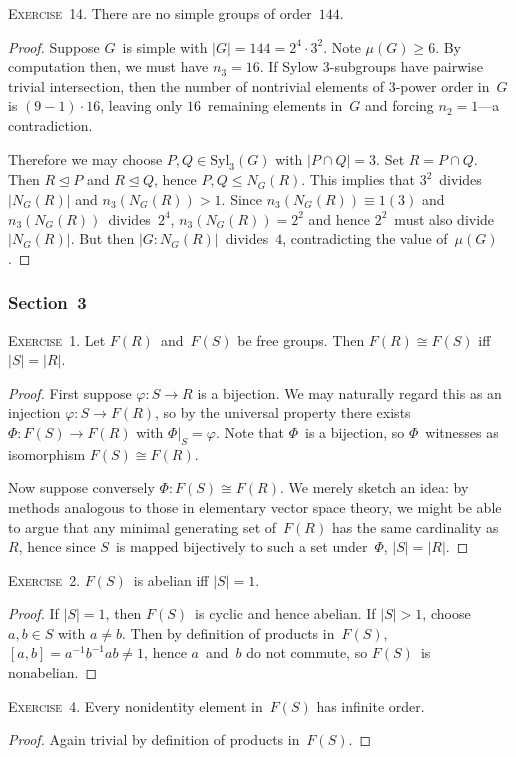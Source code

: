 \documentclass[letterpaper]{article}
\newcommand{\exercise}[1]{\goodbreak\noindent\textsc{Exercise~{#1}.}}
\newcommand{\iso}{\cong}
\newcommand{\sect}{\cap}
\newcommand{\subgroup}{\le}
\newcommand{\normal}{\trianglelefteq}
\newcommand{\syl}{\mathrm{Syl}}
\newcommand{\ord}[1]{|{#1}|}
\newcommand{\gindex}[2]{|{#1}:{#2}|}
\newcommand{\mpsi}[1]{\mu({#1})}
\begin{document}
\exercise{14}
There are no simple groups of order~$144$.
\begin{proof}
Suppose $G$~is simple with $\ord{G}=144=2^4\cdot 3^2$. Note $\mpsi{G}\ge 6$. By computation then, we must have $n_3=16$. If Sylow $3$-subgroups have pairwise trivial intersection, then the number of nontrivial elements of $3$-power order in~$G$ is $(9-1)\cdot 16$, leaving only $16$~remaining elements in~$G$ and forcing $n_2=1$---a contradiction.

Therefore we may choose $P,Q\in\syl_3(G)$ with $\ord{P\sect Q}=3$. Set $R=P\sect Q$. Then $R\normal P$ and $R\normal Q$, hence $P,Q\subgroup N_G(R)$. This implies that $3^2$~divides~$\ord{N_G(R)}$ and $n_3(N_G(R))>1$. Since $n_3(N_G(R))\equiv 1(3)$ and $n_3(N_G(R))$~divides~$2^4$, $n_3(N_G(R))=2^2$ and hence $2^2$~must also divide~$\ord{N_G(R)}$. But then $\gindex{G}{N_G(R)}$~divides~$4$, contradicting the value of~$\mpsi{G}$.
\end{proof}

\subsubsection*{Section~3}
\exercise{1}
Let $F(R)$~and~$F(S)$ be free groups. Then $F(R)\iso F(S)$ iff $\ord{S}=\ord{R}$.
\begin{proof}
First suppose $\varphi:S\to R$ is a bijection. We may naturally regard this as an injection $\varphi:S\to F(R)$, so by the universal property there exists $\Phi:F(S)\to F(R)$ with $\Phi|_S=\varphi$. Note that $\Phi$~is a bijection, so $\Phi$~witnesses as isomorphism $F(S)\iso F(R)$.

Now suppose conversely $\Phi:F(S)\iso F(R)$. We merely sketch an idea: by methods analogous to those in elementary vector space theory, we might be able to argue that any minimal generating set of~$F(R)$ has the same cardinality as~$R$, hence since $S$~is mapped bijectively to such a set under~$\Phi$, $\ord{S}=\ord{R}$.
\end{proof}

\exercise{2}
$F(S)$~is abelian iff $\ord{S}=1$.
\begin{proof}
If $\ord{S}=1$, then $F(S)$~is cyclic and hence abelian. If $\ord{S}>1$, choose $a,b\in S$ with $a\ne b$. Then by definition of products in~$F(S)$, $[a,b]=a^{-1}b^{-1}ab\ne1$, hence $a$~and~$b$ do not commute, so $F(S)$~is nonabelian.
\end{proof}

\exercise{4}
Every nonidentity element in~$F(S)$ has infinite order.
\begin{proof}
Again trivial by definition of products in~$F(S)$.
\end{proof}
\end{document}

